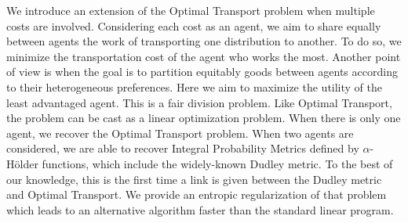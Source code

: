 
We introduce an extension of the Optimal Transport problem when multiple costs are involved. Considering each cost as an agent, we aim to share equally between agents the work of transporting one distribution to another. To do so, we minimize the transportation cost of the agent who works the most. Another point of view is when the goal is to partition equitably goods between agents according to their heterogeneous preferences. Here we aim to maximize the utility of the least advantaged agent. This is a fair division problem. Like Optimal Transport, the problem can be cast as a linear optimization problem. When there is only one agent, we recover the Optimal Transport problem. When two agents are considered, we are able to recover Integral Probability Metrics defined by $\alpha$-Hölder functions, which include the widely-known Dudley metric. To the best of our knowledge, this is the first time a link is given between the Dudley metric and Optimal Transport. We provide an entropic regularization of that problem which leads to an alternative algorithm faster than the standard linear program. 







%
%

\begin{subappendices}

\end{subappendices}

